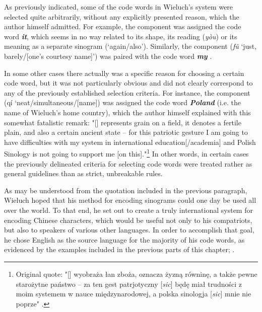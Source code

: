 \documentclass[output=paper,colorlinks,citecolor=brown,arabicfont,chinesefont]{langscibook}
\begin{document}
As previously indicated, some of the code words in Wieluch's system were selected quite arbitrarily, without any explicitly presented reason, which the author himself admitted. For example, the component {} was assigned the code word \textbf{\emph{it}}, which seems in no way related to its shape, its reading (\emph{yòu}) or its meaning as a separate sinogram (‘again/also’). Similarly, the component {} (\emph{fǔ} ‘just, barely/[one's courtesy name]’) was paired with the code word \textbf{\emph{my}} \citep[9\textsubscript{p}]{Wieluch1936}.

In some other cases there actually was a specific reason for choosing a certain code word, but it was not particularly obvious and did not clearly correspond to any of the previously established selection criteria. For instance, the component {} (qí ‘neat/simultaneous/[name]) was assigned the code word \textbf{\emph{Poland}} (i.e. the name of Wieluch's home country), which the author himself explained with this somewhat fatalistic remark: "[{}] represents grain on a field, it denotes a fertile plain, and also a certain ancient state – for this patriotic gesture I am going to have difficulties with my system in international education[/academia] and Polish Sinology is not going to support me [on this]."\footnote{Original quote: "[{}] wyobraża łan zboża, oznacza żyzną równinę, a także pewne starożytne państwo – za ten gest patrjotyczny [\emph{sic}] będę miał trudności z moim systemem w nauce międzynarodowej, a polska sinologja [\emph{sic}] mnie nie poprze" \citep[8\textsubscript{p}]{Wieluch1936}.}  In other words, in certain cases the previously delineated criteria for selecting code words were treated rather as general guidelines than as strict, unbreakable rules.

As may be understood from the quotation included in the previous paragraph, Wieluch hoped that his method for encoding sinograms could one day be used all over the world. To that end, he set out to create a truly international system for encoding Chinese characters, which would be useful not only to his compatriots, but also to speakers of various other languages. In order to accomplish that goal, he chose English as the source language for the majority of his code words, as evidenced by the examples included in the previous parts of this chapter; \citealt[1-2\textsubscript{p}]{Wieluch1936}.
\end{document}
